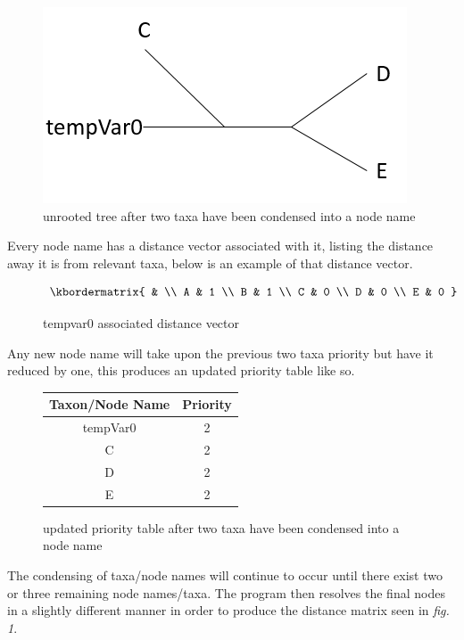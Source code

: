 \documentclass{article}
\begin{document}
\begin{figure}[!ht]

\includegraphics{secondTree.PNG} 
\caption{unrooted tree after two taxa have been condensed into a node name}
\end{figure}

Every node name has a distance vector associated with it, listing the distance away it is from relevant taxa, below is an example of that distance vector. 

\begin{figure}[!ht]
\[
\kbordermatrix{
	& \\
	A & 1 \\
	B & 1 \\
	C & 0 \\
	D & 0 \\
	E & 0
}
\]
\caption{tempvar0 associated distance vector}
\end{figure}

Any new node name will take upon the previous two taxa priority but have it reduced by one, this produces an updated priority table like so.

\begin{figure}[!ht]
\begin{center}
	\begin{tabular}{ |c|c| } 
		\hline
		Taxon/Node Name & Priority  \\
		\hline
		tempVar0 & 2 \\ 
		\hline
		C & 2 \\
		\hline 
		D & 2 \\
		\hline 
		E & 2 \\ 
		\hline
	\end{tabular}
\end{center}
\caption{updated priority table after two taxa have been condensed into a node name}
\end{figure}

The condensing of taxa/node names will continue to occur until there exist two or three remaining node names/taxa. The program then resolves the final nodes in a slightly different manner in order to produce the distance matrix seen in \textit{fig. 1}.
\end{document}
